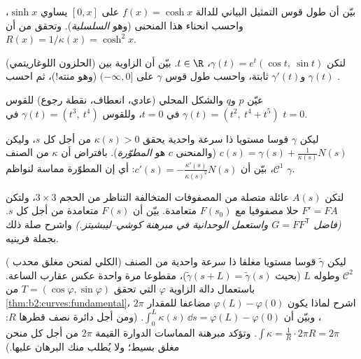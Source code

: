 \begin{exercise}[$\star$]\label{exo:b2:curves:3}
بيّن أن طول قوس التمثيل البياني للدالة $f(x) = \cosh x$ على $[0, x]$ يساوي
$\sinh x$، واحسب انحناء هذا المنحنى (وهو \emph{السلسلية}). وتحقق من أن
$R(x) = 1/\kappa(x) =
\cosh^2 x$.
\end{exercise}

\begin{exercise}[$\star\star$]\label{exo:b2:curves:4}
(الحلزون اللوغاريتمي) لتكن $\gamma(t) = e^{t}(\cos t,\ \sin t)$، $t
\in \R$.
بيّن أن الزاوية بين $\gamma(t)$ و$\gamma'(t)$ ثابتة، واحسب طول قوس $\gamma$ على
$(-\infty, 0]$ (وهو منته!)، ثم احسب .
\end{exercise}

\begin{exercise}[$\star\star$]\label{exo:b2:curves:5}
عيّن $p$ و$q$ والشكل المحلي (عادي، انعطاف، نقطة رجوع) للقوس
$\gamma(t) = (t^2,\ t^4 + t^5)$ في $t = 0$، وللقوس $\gamma(t) = (t^3,\ t^4)$ في $t = 0$.
\end{exercise}

\begin{exercise}[$\star\star$]\label{exo:b2:curves:6}
ليكن $\gamma$ قوسا مستويا ذا سرعة واحدية يحقق $\kappa(s) > 0$ من أجل كل
$s$، وليكن $c(s) = \gamma(s) + \frac{1}{\kappa(s)}N(s)$  (والمنحنى $c$ هو
\emph{المطوّرة}). بافتراض أن $\kappa$ من الصنف $\mathcal{C}^1$، بيّن أن $c'(s) =
-\frac{\kappa'(s)}{\kappa(s)^2}N(s)$:
أي إن المطوّرة مماسة لنواظم $\gamma$.
\end{exercise}

\begin{exercise}[$\star\star\star$]\label{exo:b2:curves:7}
لتكن $A(s)$ عائلة متصلة من المصفوفات المتخالفة التناظر من الحجم
$3 \times 3$، ولتكن $F' = F A$ حلا مصفوفيا مع $F(s_0)$ متعامدة. بيّن أن $F(s)$
متعامدة من أجل كل $s$. \emph{(فاضل $G = F F^{\mathsf T}$ واستعمل الوحدانية في
مبرهنة كوشي--ليبشيتز.)} واشرح صلة ذلك بجملة فرينيه.
\end{exercise}

\begin{exercise}[$\star\star\star$]\label{exo:b2:curves:8}
( الكلي لمنحن مغلق محدب) ليكن $\tilde\gamma$ قوسا مستويا مغلقا ذا
سرعة واحدية من الصنف $\mathcal{C}^2$ وطوله $L$ (بحيث $\tilde\gamma(s + L) = \tilde\gamma(s)$)، مقطوعا
مرة واحدة عكس عقارب الساعة. باستعمال دالة الزاوية $\varphi$ التي تحقق
$T =
(\cos\varphi, \sin\varphi)$ من \cref{thm:b2:curves:fundamental}، اشرح لماذا يكون $\varphi(L) -
\varphi(0)$ مضاعفا للمقدار $2\pi$،
وبيّن أن $\int_0^L \kappa(s)\,\dd s = \varphi(L) - \varphi(0)$. (ومن أجل دائرة نصف قطرها $R$: $\int \kappa = \frac1R \cdot 2\pi R = 2\pi$. وتؤكد
مبرهنة المماسات الدوارة القيمة $2\pi$ من أجل كل منحن مغلق بسيط؛
ولا يُطلب منك البرهان عليها.)
\end{exercise}

